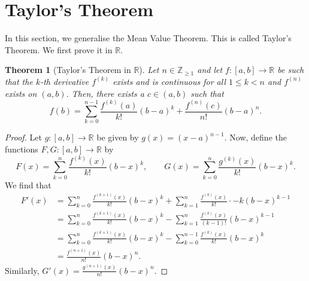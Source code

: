 \documentclass[a4paper, openany]{memoir}
\theoremstyle{definition}
\theoremstyle{plain}
\newtheorem{theorem}[definition]{Theorem}
\begin{document}
\section{Taylor's Theorem}
In this section, we generalise the Mean Value Theorem. This is called Taylor's Theorem. We first prove it in $\mathbb{R}$.
\begin{theorem}[Taylor's Theorem in $\mathbb{R}$]
Let $n \in \mathbb{Z}_{\geqslant 1}$ and let $f: [a, b] \to \mathbb{R}$ be such that the $k$-th derivative $f^{(k)}$ exists and is continuous for all $1 \leqslant k < n$ and $f^{(n)}$ exists on $(a, b)$. Then, there exists a $c \in (a, b)$ such that
\[f(b) = \sum_{k=0}^{n-1} \frac{f^{(k)}(a)}{k!} (b - a)^k + \frac{f^{(n)}(c)}{n!} (b - a)^n.\]
\end{theorem}
\begin{proof}
Let $g: [a, b] \to \mathbb{R}$ be given by $g(x) = (x - a)^{n-1}$. Now, define the functions $F, G: [a, b] \to \mathbb{R}$ by
\[F(x) = \sum_{k=0}^n \frac{f^{(k)}(x)}{k!} (b - x)^k, \qquad G(x) = \sum_{k=0}^n \frac{g^{(k)}(x)}{k!} (b - x)^k.\]
We find that
\begin{align*}
    F'(x) &= \sum_{k=0}^n \frac{f^{(k+1)}(x)}{k!} (b-x)^k + \sum_{k=1}^n \frac{f^{(k)}(x)}{k!} \cdot -k(b-x)^{k-1} \\
    &= \sum_{k=0}^n \frac{f^{(k+1)}(x)}{k!} (b-x)^k - \sum_{k=1}^n \frac{f^{(k)}(x)}{(k-1)!} (b-x)^{k-1} \\
    &= \sum_{k=0}^n \frac{f^{(k+1)}(x)}{k!} (b-x)^k - \sum_{k=0}^{n-1} \frac{f^{(k)}(x)}{k!} (b-x)^k \\
    &= \frac{f^{(n+1)}(x)}{n!} (b-x)^n.
\end{align*}
Similarly, $G'(x) = \frac{g^{(n+1)}(x)}{n!} (b-x)^n$.


\end{proof}
\end{document}
